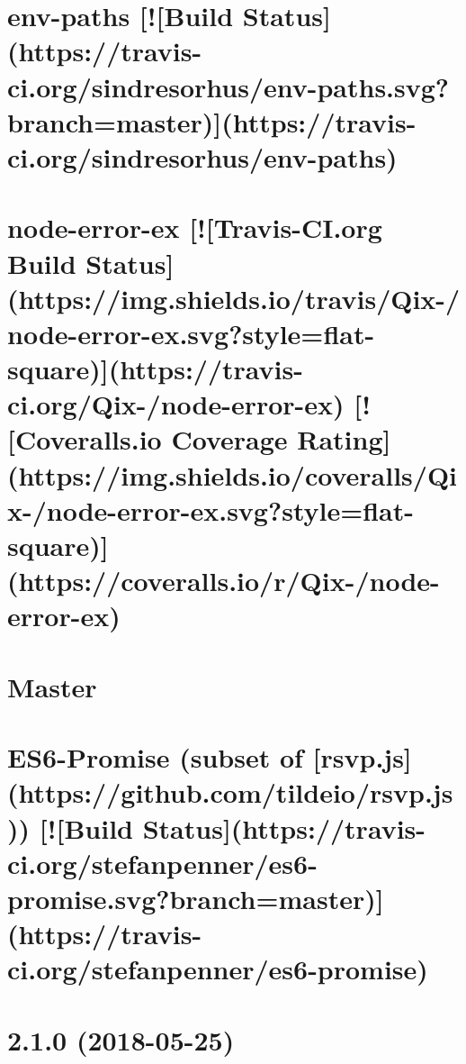 \documentclass[twoside]{book}
\newcommand{\+}{\discretionary{\mbox{\scriptsize$\hookleftarrow$}}{}{}}
\begin{document}
\chapter{env-\/paths \mbox{[}!\mbox{[}Build Status\mbox{]}(https\+://travis-\/ci.org/sindresorhus/env-\/paths.svg?branch=master)\mbox{]}(https\+://travis-\/ci.org/sindresorhus/env-\/paths)}
\label{md_dsmacc_examples_DRmerge_node_modules_env-paths_readme}

\chapter{node-\/error-\/ex \mbox{[}!\mbox{[}Travis-\/\+CI.org Build Status\mbox{]}(https\+://img.shields.\+io/travis/\+Qix-\//node-\/error-\/ex.svg?style=flat-\/square)\mbox{]}(https\+://travis-\/ci.org/\+Qix-\//node-\/error-\/ex) \mbox{[}!\mbox{[}Coveralls.\+io Coverage Rating\mbox{]}(https\+://img.shields.\+io/coveralls/\+Qix-\//node-\/error-\/ex.svg?style=flat-\/square)\mbox{]}(https\+://coveralls.io/r/\+Qix-\//node-\/error-\/ex)}
\label{md_dsmacc_examples_DRmerge_node_modules_error-ex_README}

\chapter{Master}
\label{md_dsmacc_examples_DRmerge_node_modules_es6-promise_CHANGELOG}

\chapter{E\+S6-\/\+Promise (subset of \mbox{[}rsvp.\+js\mbox{]}(https\+://github.com/tildeio/rsvp.js)) \mbox{[}!\mbox{[}Build Status\mbox{]}(https\+://travis-\/ci.org/stefanpenner/es6-\/promise.svg?branch=master)\mbox{]}(https\+://travis-\/ci.org/stefanpenner/es6-\/promise)}
\label{md_dsmacc_examples_DRmerge_node_modules_es6-promise_README}

\chapter{2.1.0 (2018-\/05-\/25)}
\label{md_dsmacc_examples_DRmerge_node_modules_events_History}

\end{document}
